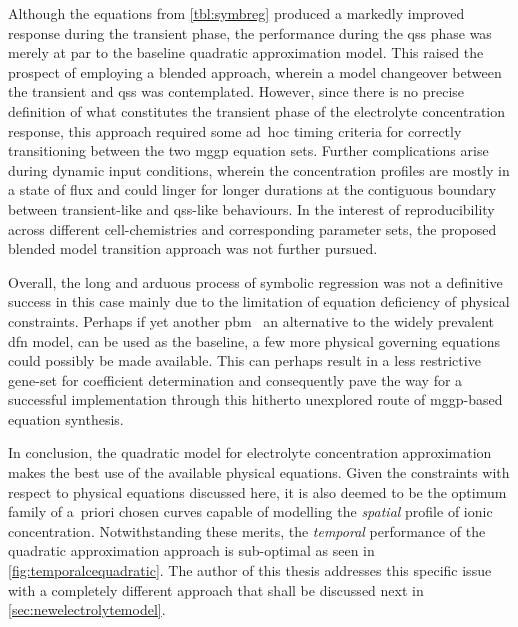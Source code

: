 Although  the equations  from \cref{tbl:symbreg}  produced  a markedly  improved
response during the transient phase,  the performance during the \gls{qss} phase
was merely at par to the baseline quadratic approximation model. This raised the
prospect of  employing a  blended approach, wherein  a model  changeover between
the  transient  and \gls{qss}  was  contemplated.  However,  since there  is  no
precise definition  of what constitutes  the transient phase of  the electrolyte
concentration response, this  approach required some \mbox{ad hoc}  timing
criteria for correctly  transitioning  between  the  two \gls{mggp}  equation
sets.  Further complications arise  during dynamic input conditions,  wherein
the concentration profiles are mostly in a state of  flux and could linger for
longer durations at the contiguous  boundary between  transient-like and
\gls{qss}-like behaviours. In  the  interest  of  reproducibility  across
different  cell-chemistries  and corresponding parameter sets, the proposed
blended model transition approach was not further pursued.

Overall,  the  long  and  arduous  process of  symbolic  regression  was  not  a
definitive  success in  this  case  mainly due  to  the  limitation of  equation
deficiency  of physical  constraints. Perhaps  if yet  another \gls{pbm}  \ie~an
alternative  to  the widely  prevalent  \gls{dfn}  model,  can  be used  as  the
baseline,  a  few more  physical  governing  equations  could possibly  be  made
available.  This  can  perhaps  result   in  a  less  restrictive  gene-set  for
coefficient  determination  and  consequently  pave the  way  for  a  successful
implementation  through  this  hitherto  unexplored  route  of  \gls{mggp}-based
equation synthesis.

In conclusion,  the quadratic model for  electrolyte concentration approximation
makes the  best use of the  available physical equations. Given  the constraints
with  respect to  physical equations  discussed here,  it is  also deemed  to be
the  optimum  family  of  a~priori  chosen  curves  capable  of  modelling  the
\emph{spatial}  profile of  ionic concentration.  Notwithstanding these  merits,
the  \emph{temporal}  performance of  the  quadratic  approximation approach  is
sub-optimal as seen in \cref{fig:temporalcequadratic}. The author of this thesis
addresses this specific issue with a completely different approach that shall be
discussed next in \cref{sec:newelectrolytemodel}.

